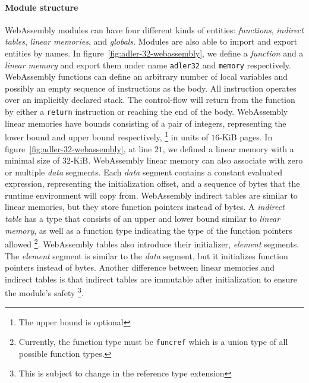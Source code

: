 \paragraph{Module structure}
WebAssembly modules can have four different kinds of entities: \emph{functions},
\emph{indirect tables}, \emph{linear memories}, and \emph{globals}. Modules are
also able to import and export entities by names. In
figure~\ref{fig:adler-32-webassembly}, we define a \emph{function} and a
\emph{linear memory} and export them under name \texttt{adler32} and
\texttt{memory} respectively. WebAssembly functions can define an arbitrary
number of local variables and possibly an empty sequence of instructions as the
body. All instruction operates over an implicitly declared stack. The
control-flow will return from the function by either a \texttt{return}
instruction or reaching the end of the body. WebAssembly linear memories have
bounds consisting of a pair of integers, representing the lower bound and upper
bound respectively, \footnote{The upper bound is optional} in units of $16$-KiB
pages. In figure~\ref{fig:adler-32-webassembly}, at line $21$, we defined a
linear memory with a minimal size of $32$-KiB. WebAssembly linear memory can
also associate with zero or multiple \emph{data} segments. Each \emph{data}
segment contains a constant evaluated expression, representing the
initialization offset, and a sequence of bytes that the runtime environment will
copy from. WebAssembly indirect tables are similar to linear memories, but they
store function pointers instead of bytes. A \emph{indirect table} has a type
that consists of an upper and lower bound similar to \emph{linear memory}, as
well as a function type indicating the type of the function pointers allowed
\footnote{Currently, the function type must be \texttt{funcref} which is a union
  type of all possible function types.}. WebAssembly tables also introduce their
initializer, \emph{element} segments. The \emph{element} segment is similar to
the \emph{data} segment, but it initializes function pointers instead of bytes.
Another difference between linear memories and indirect tables is that indirect
tables are immutable after initialization to ensure the module's safety
\footnote{This is subject to change in the reference type extension}.

